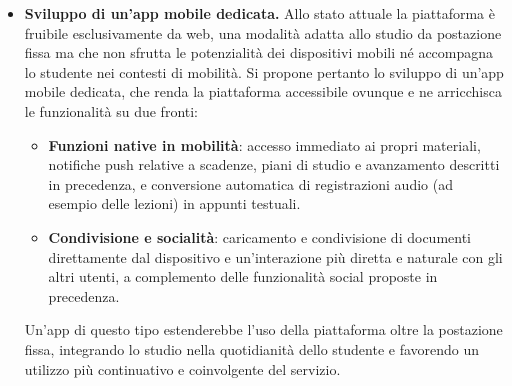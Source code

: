 \begin{itemize}
  \item \textbf{Sviluppo di un'app mobile dedicata.} Allo stato attuale la
  piattaforma è fruibile esclusivamente da web, una modalità adatta allo studio
  da postazione fissa ma che non sfrutta le potenzialità dei dispositivi mobili
  né accompagna lo studente nei contesti di mobilità. Si propone pertanto lo
  sviluppo di un'app mobile dedicata, che renda la piattaforma accessibile
  ovunque e ne arricchisca le funzionalità su due fronti:
  \begin{itemize}
    \item \textbf{Funzioni native in mobilità}: accesso immediato ai propri
    materiali, notifiche push relative a scadenze, piani di studio e avanzamento
    descritti in precedenza, e conversione automatica di registrazioni audio (ad
    esempio delle lezioni) in appunti testuali.
    \item \textbf{Condivisione e socialità}: caricamento e condivisione di
    documenti direttamente dal dispositivo e un'interazione più diretta e
    naturale con gli altri utenti, a complemento delle funzionalità social
    proposte in precedenza.
  \end{itemize}
  Un'app di questo tipo estenderebbe l'uso della piattaforma oltre la postazione
  fissa, integrando lo studio nella quotidianità dello studente e favorendo un
  utilizzo più continuativo e coinvolgente del servizio.
\end{itemize}
